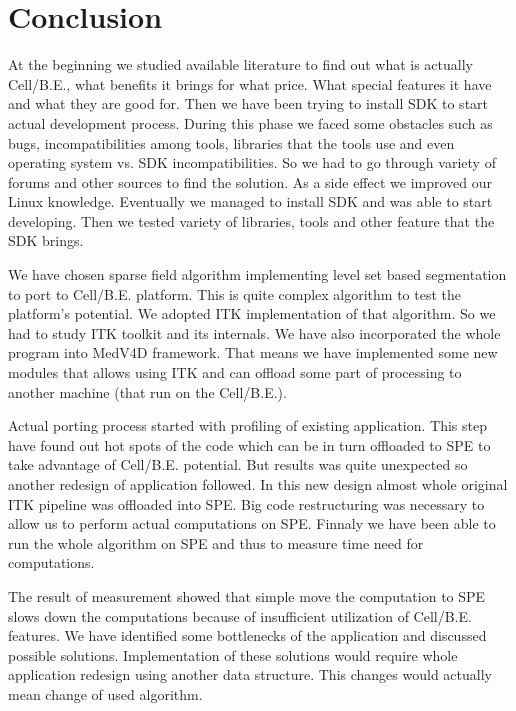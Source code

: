 \chapter{Conclusion}

\par
At the beginning we studied available literature to find out what is actually Cell/B.E., what benefits it brings for what price.
What special features it have and what they are good for.
Then we have been trying to install SDK to start actual development process.
During this phase we faced some obstacles such as bugs, incompatibilities among tools, libraries that the tools use and even operating system vs. SDK incompatibilities.
So we had to go through variety of forums and other sources to find the solution.
As a side effect we improved our Linux knowledge.
Eventually we managed to install SDK and was able to start developing.
Then we tested variety of libraries, tools and other feature that the SDK brings.

\par
We have chosen sparse field algorithm implementing level set based segmentation to port to Cell/B.E. platform.
This is quite complex algorithm to test the platform's potential.
We adopted ITK implementation of that algorithm.
So we had to study ITK toolkit and its internals.
We have also incorporated the whole program into MedV4D framework.
That means we have implemented some new modules that allows using ITK and can offload some part of processing to another machine (that run on the Cell/B.E.).

\par
Actual porting process started with profiling of existing application.
This step have found out hot spots of the code which can be in turn offloaded to SPE to take advantage of Cell/B.E. potential.
But results was quite unexpected so another redesign of application followed.
In this new design almost whole original ITK pipeline was offloaded into SPE.
Big code restructuring was necessary to allow us to perform actual computations on SPE.
Finnaly we have been able to run the whole algorithm on SPE and thus to measure time need for computations.

\par
The result of measurement showed that simple move the computation to SPE slows down the computations because of insufficient utilization of Cell/B.E. features.
We have identified some bottlenecks of the application and discussed possible solutions.
Implementation of these solutions would require whole application redesign using another data structure.
This changes would actually mean change of used algorithm.

